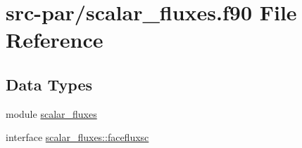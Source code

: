 \hypertarget{scalar__fluxes_8f90}{\section{src-\/par/scalar\-\_\-fluxes.f90 File Reference}
\label{scalar__fluxes_8f90}
}
\subsection*{Data Types}
\begin{DoxyCompactItemize}
\item 
module \hyperlink{classscalar__fluxes}{scalar\-\_\-fluxes}
\item 
interface \hyperlink{interfacescalar__fluxes_1_1facefluxsc}{scalar\-\_\-fluxes\-::facefluxsc}
\end{DoxyCompactItemize}
